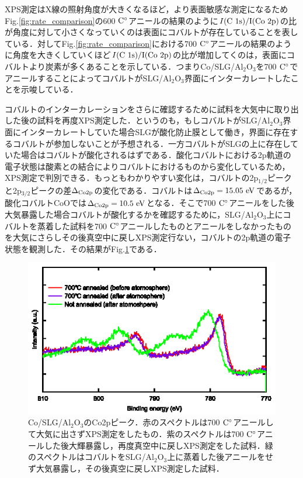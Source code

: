 {XPS測定はX線の照射角度が大きくなるほど，より表面敏感な測定になるためFig.\ref{fig:rate_comparison}の600$\rm\ C^{\circ}$アニールの結果のように$I(\rm C\ 1s)/I(\rm Co\ 2p)$の比が角度に対して小さくなっていくのは表面にコバルトが存在していることを表している．対してFig.\ref{fig:rate_comparison}における700$\rm\ C^{\circ}$アニールの結果のように角度を大きくしていくほど$I(\rm C\ 1s)/I(\rm Co\ 2p)$の比が増加してくのは，表面にコバルトより炭素が多くあることを示している．つまりCo/SLG/Al$_{2}$O$_{3}$を700$\rm\ C^{\circ}$でアニールすることによってコバルトがSLG/Al$_{2}$O$_{3}$界面にインターカレートしたことを示唆している．

コバルトのインターカレーションをさらに確認するために試料を大気中に取り出した後の試料を再度XPS測定した．というのも，もしコバルトがSLG/Al$_{2}$O$_{3}$界面にインターカレートしていた場合SLGが酸化防止膜として働き，界面に存在するコバルトが参加しないことが予想される．一方コバルトがSLGの上に存在していた場合はコバルトが酸化されるはずである．酸化コバルトにおける2p軌道の電子状態は酸素との結合によりコバルトにおけるものから変化しているため，XPS測定で判別できる．もっともわかりやすい変化は，コバルトの2p$_{1/2}$ピークと2p$_{3/2}$ピークの差$\Delta_{\rm Co2p}$の変化である．コバルトは$\Delta_{\rm Co2p} = 15.05\rm\ eV$であるが，酸化コバルトCoOでは$\Delta_{\rm Co2p} = 10.5\rm\ eV$となる．そこで700$\rm\ C^{\circ}$アニールをした後大気暴露した場合コバルトが酸化するかを確認するために，SLG/Al$_{2}$O$_{3}$上にコバルトを蒸着した試料を700$\rm\ C^{\circ}$アニールしたものとアニールをしなかったものを大気にさらしその後真空中に戻しXPS測定行ない，コバルトの2p軌道の電子状態を観測した．その結果がFig.\ref{fig:atom_comparison}である．

\begin{figure}[htbp]
\centerline{
\includegraphics[width=12cm]{images/atom_comparison.eps}
}
\caption{Co/SLG/Al$_{2}$O$_{3}$のCo2pピーク．赤のスペクトルは700$\rm\ C^{\circ}$アニールして大気に出さずXPS測定をしたもの．紫のスペクトルは700$\rm\ C^{\circ}$アニールした後大輝暴露し，再度真空中に戻しXPS測定をした試料．緑のスペクトルはコバルトをSLG/Al$_{2}$O$_{3}$上に蒸着した後アニールをせず大気暴露し，その後真空に戻しXPS測定した試料．
}
\label{fig:atom_comparison} 
\end{figure}

}
